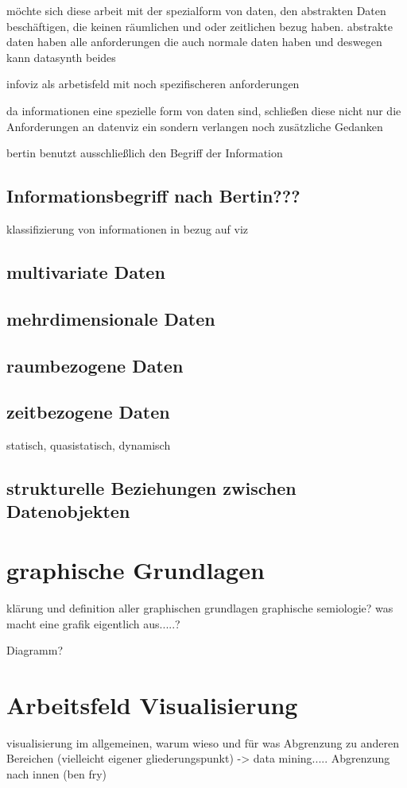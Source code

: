 \documentclass[a4paper, 12pt, onepage, pdftex, headsepline, footsepline]{scrreprt}
\begin{document}
möchte sich diese arbeit mit der spezialform von daten, den abstrakten Daten beschäftigen, die keinen räumlichen und oder zeitlichen bezug haben.
abstrakte daten haben alle anforderungen die auch normale daten haben und deswegen kann datasynth beides

infoviz als arbetisfeld mit noch spezifischeren anforderungen

da informationen eine spezielle form von daten sind, schließen diese nicht nur die Anforderungen an datenviz ein sondern verlangen noch zusätzliche Gedanken

bertin benutzt ausschließlich den Begriff der Information

\subsection{Informationsbegriff nach Bertin???}

klassifizierung von informationen in bezug auf viz

\subsection{multivariate Daten}
\subsection{mehrdimensionale Daten}
\subsection{raumbezogene Daten}
\subsection{zeitbezogene Daten}
statisch, quasistatisch, dynamisch
\subsection{strukturelle Beziehungen zwischen Datenobjekten}

\section{graphische Grundlagen}

klärung und definition aller graphischen grundlagen
graphische semiologie?
was macht eine grafik eigentlich aus.....?

Diagramm?

\section{Arbeitsfeld Visualisierung}
visualisierung im allgemeinen, warum wieso und für was
Abgrenzung zu anderen Bereichen (vielleicht eigener gliederungspunkt) -> data mining.....
Abgrenzung nach innen (ben fry)
\end{document}
